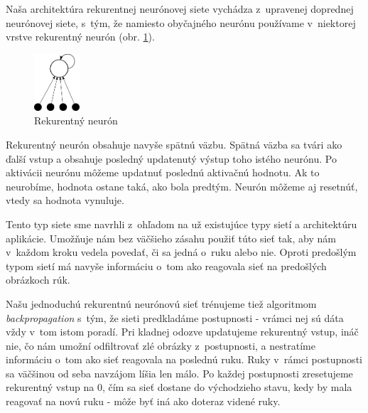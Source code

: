 Naša architektúra rekurentnej neurónovej siete vychádza z~upravenej doprednej neurónovej siete, s~tým, že namiesto obyčajného neurónu používame v~niektorej vrstve rekurentný neurón (obr. \ref{fig:recurentneuron}). 

\begin{figure}[htbp]
  \begin{center}
    \includegraphics[width=0.15\textwidth]{images/recneuron}
  \end{center}
  \caption{Rekurentný neurón}
  \label{fig:recurentneuron}
\end{figure}

Rekurentný neurón obsahuje navyše spätnú väzbu. Spätná väzba sa tvári ako ďalší vstup a obsahuje posledný updatenutý výstup toho istého neurónu. Po aktivácii neurónu môžeme updatnuť poslednú aktivačnú hodnotu. Ak to neurobíme, hodnota ostane taká, ako bola predtým. Neurón môžeme aj resetnúť, vtedy sa hodnota vynuluje.

Tento typ siete sme navrhli z~ohľadom na už existujúce typy sietí a architektúru aplikácie. Umožňuje nám bez väčšieho zásahu použiť túto sieť tak, aby nám v~každom kroku vedela povedať, či sa jedná o~ruku alebo nie. Oproti predošlým typom sietí má navyše informáciu o~tom ako reagovala sieť na predošlých obrázkoch rúk.

Našu jednoduchú rekurentnú neurónovú sieť trénujeme tiež algoritmom \textit{backpropagation} s~tým, že sieti predkladáme postupnosti - vrámci nej sú dáta vždy v~tom istom poradí. Pri kladnej odozve updatujeme rekurentný vstup, ináč nie, čo nám umožní odfiltrovať zlé obrázky z~postupnosti, a nestratíme informáciu o~tom ako sieť reagovala na poslednú ruku. Ruky v~rámci postupnosti sa väčšinou od seba navzájom líšia len málo. Po každej postupnosti zresetujeme rekurentný vstup na 0, čím sa sieť dostane do východzieho stavu, kedy by mala reagovať na novú ruku - môže byť iná ako doteraz videné ruky.